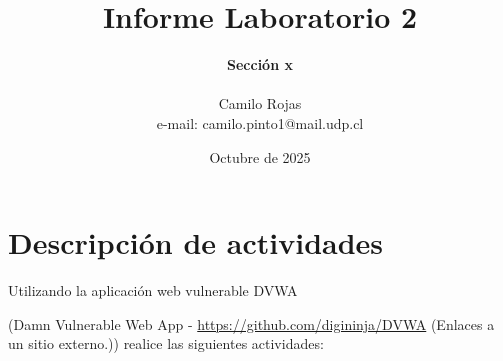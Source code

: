 \documentclass[letterpaper,12pt]{article}
\begin{document}
%
   \title{\Huge{Informe Laboratorio 2}}

   \author{\textbf{Sección x} \\  \\Camilo Rojas \\ e-mail: camilo.pinto1@mail.udp.cl}
          
   \date{Octubre de 2025}

   \maketitle
   
   \tableofcontents
 
  \newpage
  

\section{Descripción de actividades}
Utilizando la aplicación web vulnerable DVWA

(Damn Vulnerable Web App - \href{https://github.com/digininja/DVWA}{https://github.com/digininja/DVWA} (Enlaces a un sitio externo.)) realice las siguientes actividades:
\end{document}

